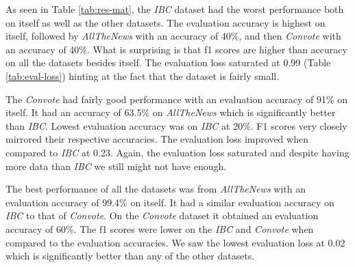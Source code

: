\documentclass[10pt,a4paper,onecolumn]{article}
\begin{document}
As seen in Table \ref{tab:res-mat}, the \textit{IBC} dataset had the worst performance both on itself as well as the other datasets. The evaluation accuracy is highest on itself, followed by \textit{AllTheNews} with an accuracy of 40\%, and then \textit{Convote} with an accuracy of 40\%. What is surprising is that f1 scores are higher than accuracy on all the datasets besides itself. The evaluation loss saturated at 0.99 (Table \ref{tab:eval-loss}) hinting at the fact that the dataset is fairly small.

The \textit{Convote} had fairly good performance with an evaluation accuracy of 91\% on itself. It had an accuracy of 63.5\% on \textit{AllTheNews} which is significantly better than \textit{IBC}. Lowest evaluation accuracy was on \textit{IBC} at 20\%. F1 scores very closely mirrored their respective accuracies. The evaluation loss improved when compared to \textit{IBC} at 0.23. Again, the evaluation loss saturated and despite having more data than \textit{IBC} we still might not have enough.

The best performance of all the datasets was from \textit{AllTheNews} with an evaluation accuracy of 99.4\% on itself. It had a similar evaluation accuracy on \textit{IBC} to that of \textit{Convote}. On the \textit{Convote} dataset it obtained an evaluation accuracy of 60\%. The f1 scores were lower on the \textit{IBC} and \textit{Convote} when compared to the evaluation accuracies. We saw the lowest evaluation loss at 0.02 which is significantly better than any of the other datasets.
\end{document}
